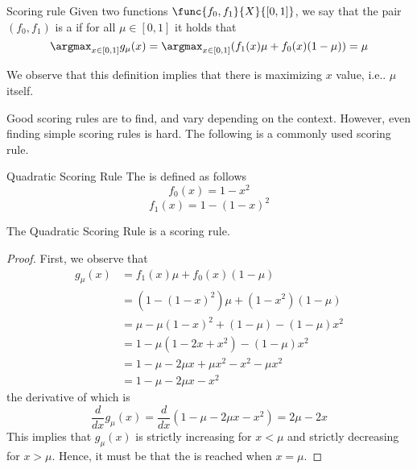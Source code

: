 \documentclass[a4paper, 12pt]{report}
\begin{document}
    \begin{frameddefn}{Scoring rule}
        Given two functions $\func{f_0, f_1}{X}{[0, 1]}$, we say that the pair $(f_0, f_1)$ is a  if for all $\mu \in [0, 1]$ it holds that $$\argmax_{x \in [0, 1]}{g_\mu(x)} = \argmax_{x \in [0, 1]} {(f_1(x) \mu + f_0(x)(1 - \mu))}= \mu$$
    \end{frameddefn}

    We observe that this definition implies that there is  maximizing $x$ value, i.e.. $\mu$ itself.

    Good scoring rules are  to find, and vary depending on the context. However, even finding simple scoring rules is hard. The following is a commonly used scoring rule.

    \begin{frameddefn}{Quadratic Scoring Rule}
        The  is defined as follows $$f_0(x) = 1 - x^2$$ $$f_1(x) = 1 - (1 - x)^2$$
    \end{frameddefn}

    \begin{framedthm}{}
        The Quadratic Scoring Rule is a scoring rule.
    \end{framedthm}

    \begin{proof}
        First, we observe that
        \begin{equation*}
            \begin{split}
                g_\mu(x) &= f_1(x)\mu + f_0(x)(1 - \mu) \\
                         &= (1 - (1 - x)^2) \mu + (1 - x^2)(1 - \mu) \\
                         &= \mu - \mu(1 - x)^2 + (1 - \mu) - (1 - \mu)x^2 \\
                         &= 1 - \mu(1 - 2x + x^2) - (1 - \mu)x^2 \\
                         &= 1 - \mu - 2\mu x + \mu x^2 - x^2 - \mu x^2 \\
                         &= 1 - \mu - 2 \mu x - x^2
            \end{split}
        \end{equation*}
        the derivative of which is $$\dfrac{d}{dx}g_\mu(x) = \dfrac{d}{dx}(1 - \mu - 2 \mu x - x^2) = 2 \mu - 2x$$ This implies that $g_\mu (x)$ is strictly increasing for $x < \mu$ and strictly decreasing for $x > \mu$. Hence, it must be that the  is reached when $x = \mu$.
    \end{proof}
\end{document}
